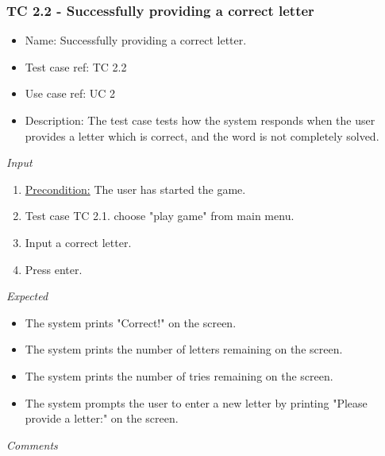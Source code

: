 \documentclass[12pt, letterpaper]{article}
\begin{document}
\subsubsection{TC 2.2 - Successfully providing a correct letter}
\begin{itemize}
	\item Name: Successfully providing a correct letter.
	\item Test case ref: TC 2.2
	\item Use case ref: UC 2
	\item Description: The test case tests how the system responds when the user provides a letter which is correct, and the word is not completely solved.
\end{itemize}
\emph{Input}
\begin{enumerate}
	\item \underline{Precondition:} The user has started the game.
	\item Test case TC 2.1. choose "play game" from main menu.
	\item Input a correct letter.
	\item Press enter.
\end{enumerate}
\emph{Expected}
\begin{itemize}
	\item The system prints "Correct!" on the screen.
	\item The system prints the number of letters remaining on the screen.
	\item The system prints the number of tries remaining on the screen.
	\item The system prompts the user to enter a new letter by printing "Please provide a letter:" on the screen.
\end{itemize}
\begin{Form}
	\newline
	\newline
\end{Form}
\newline
\emph{Comments}
\newline
\newline
\newline
\newline
\newline
\newline
\newline
\end{document}
